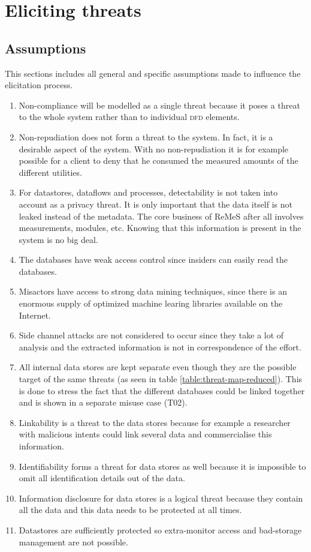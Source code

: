 \section{Eliciting threats}
\label{sec:eliciting-threats}

\subsection{Assumptions}
\label{sec:assumptions}

\npar This sections includes all general and specific assumptions made to
influence the elicitation process.

\begin{enumerate}

  \item Non-compliance will be modelled as a single threat because it poses a
  threat to the whole system rather than to individual \textsc{dfd} elements.
  \item Non-repudiation does not form a threat to the system. In fact, it is a
  desirable aspect of the system. With no non-repudiation it is for
  example possible for a client to deny that he consumed the measured amounts
  of the different utilities.
  \item For datastores, dataflows and processes, detectability is not taken into
  account as a privacy threat. It is only important that the data itself is not
  leaked instead of the metadata. The core business of ReMeS after all involves
  measurements, modules, etc. Knowing that this information is present in the
  system is no big deal.
  \item The databases have weak access control since insiders can easily read
  the databases.
  \item Misactors have access to strong data mining techniques, since
  there is an enormous supply of optimized machine learing libraries available
  on the Internet.
  \item Side channel attacks are not considered to occur since they take a lot
  of analysis and the extracted information is not in correspondence of the
  effort.
   
  \item All internal data stores are kept separate even though they are the
  possible target of the same threats (as seen in table
  \ref{table:threat-map-reduced}). This is done to stress the fact that the
  different databases could be linked together and is shown in a separate
  misuse case (T02).
  \item Linkability is a threat to the data stores because for example a
  researcher with malicious intents could link several data and commercialise
  this information.
  \item Identifiability forms a threat for data stores as well because it is
  impossible to omit all identification details out of the data. 
  \item Information disclosure for data stores is a logical threat because they
  contain all the data and this data needs to be protected at all times.
  \item Datastores are sufficiently protected so extra-monitor access and
  bad-storage management are not possible.
  

\end{enumerate}
